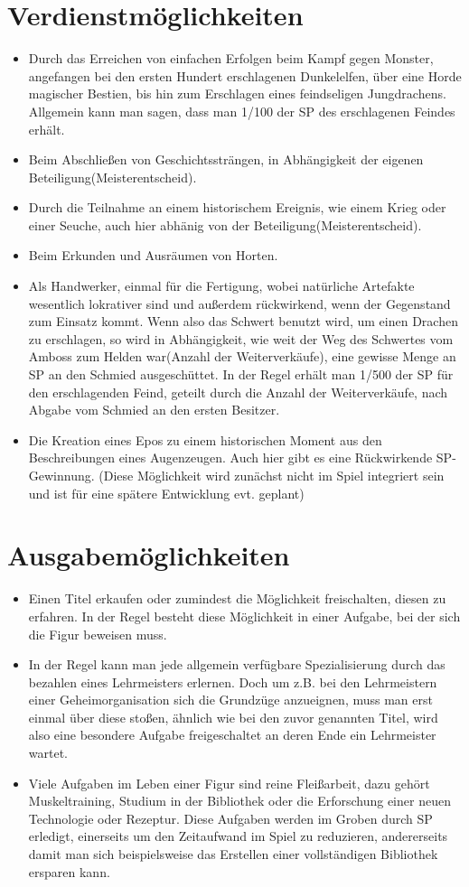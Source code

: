 \documentclass[a4paper,12pt,oneside]{book}
\begin{document}
\section{Verdienstmöglichkeiten}
\begin{itemize}
\item Durch das Erreichen von einfachen Erfolgen beim Kampf gegen Monster, angefangen bei den ersten Hundert erschlagenen Dunkelelfen, über eine Horde magischer Bestien, bis hin zum Erschlagen eines feindseligen Jungdrachens. Allgemein kann man sagen, dass man 1/100 der SP des erschlagenen Feindes erhält.
\item Beim Abschließen von Geschichtssträngen, in Abhängigkeit der eigenen Beteiligung(Meisterentscheid).
\item Durch die Teilnahme an einem historischem Ereignis, wie einem Krieg oder einer Seuche, auch hier abhänig von der Beteiligung(Meisterentscheid).
\item Beim Erkunden und Ausräumen von Horten.
\item Als Handwerker, einmal für die Fertigung, wobei natürliche Artefakte wesentlich lokrativer sind und außerdem rückwirkend, wenn der Gegenstand zum Einsatz kommt. Wenn also das Schwert benutzt wird, um einen Drachen zu erschlagen, so wird in Abhängigkeit, wie weit der Weg des Schwertes vom Amboss zum Helden war(Anzahl der Weiterverkäufe), eine gewisse Menge an SP an den Schmied ausgeschüttet. In der Regel erhält man 1/500 der SP für den erschlagenden Feind, geteilt durch die Anzahl der Weiterverkäufe, nach Abgabe vom Schmied an den ersten Besitzer.
\item Die Kreation eines Epos zu einem historischen Moment aus den Beschreibungen eines Augenzeugen. Auch hier gibt es eine Rückwirkende SP-Gewinnung. (Diese Möglichkeit wird zunächst nicht im Spiel integriert sein und ist für eine spätere Entwicklung evt. geplant)

\end{itemize}
\section{Ausgabemöglichkeiten}
\begin{itemize}
\item Einen Titel erkaufen oder zumindest die Möglichkeit freischalten, diesen zu erfahren. In der Regel besteht diese Möglichkeit in einer Aufgabe, bei der sich die Figur beweisen muss.
\item In der Regel kann man jede allgemein verfügbare Spezialisierung durch das bezahlen eines Lehrmeisters erlernen. Doch um z.B. bei den Lehrmeistern einer Geheimorganisation sich die Grundzüge anzueignen, muss man erst einmal über diese stoßen, ähnlich wie bei den zuvor genannten Titel, wird also eine besondere Aufgabe freigeschaltet an deren Ende ein Lehrmeister wartet.
\item Viele Aufgaben im Leben einer Figur sind reine Fleißarbeit, dazu gehört Muskeltraining, Studium in der Bibliothek oder die Erforschung einer neuen Technologie oder Rezeptur. Diese Aufgaben werden im Groben durch SP erledigt, einerseits um den Zeitaufwand im Spiel zu reduzieren, andererseits damit man sich beispielsweise das Erstellen einer vollständigen Bibliothek ersparen kann.
\end{itemize}
\end{document}
